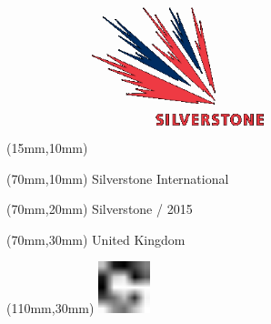 \null\newpage
\begin{textblock*}{50mm}(15mm,10mm)%
\includegraphics[width=50mm]{LG/SIL.png}
\end{textblock*}
\begin{textblock*}{130mm}(70mm,10mm)%
{\fontsize{20}{20}\selectfont Silverstone International}\\
\end{textblock*}
\begin{textblock*}{120mm}(70mm,20mm)%
{\fontsize{16}{16}\selectfont Silverstone / 2015}\\
\end{textblock*}
\begin{textblock*}{120mm}(70mm,30mm)%
{\fontsize{12}{12}\selectfont United Kingdom}
\end{textblock*}
\begin{textblock*}{30mm}(110mm,30mm)%
\centering
\includegraphics[height=15mm]{icons/fa-rotate-right.pdf}
\end{textblock*}
